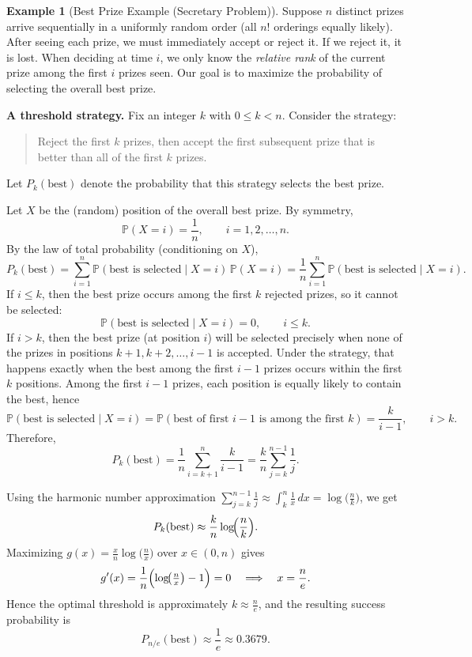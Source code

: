 \documentclass[11pt]{article}
\theoremstyle{plain}
\theoremstyle{definition}
\newtheorem{example}[theorem]{Example}
\theoremstyle{remark}
\begin{document}
	\begin{example}[Best Prize Example (Secretary Problem)]
		\label{ex:best-prize}
		Suppose \(n\) distinct prizes arrive sequentially in a uniformly random order (all \(n!\) orderings equally likely). After seeing each prize, we must immediately accept or reject it. If we reject it, it is lost. When deciding at time \(i\), we only know the \emph{relative rank} of the current prize among the first \(i\) prizes seen. Our goal is to maximize the probability of selecting the overall best prize.
		
		
		\textbf{A threshold strategy.}
		Fix an integer \(k\) with \(0 \le k < n\). Consider the strategy:
		\begin{quote}
			Reject the first \(k\) prizes, then accept the first subsequent prize that is better than all of the first \(k\) prizes.
		\end{quote}
		Let \(P_k(\text{best})\) denote the probability that this strategy selects the best prize.
		
		
		Let \(X\) be the (random) position of the overall best prize. By symmetry,
		\[
		\mathbb{P}(X=i)=\frac{1}{n}, \qquad i=1,2,\dots,n.
		\]
		By the law of total probability (conditioning on \(X\)),
		\[
		P_k(\text{best})
		= \sum_{i=1}^n \mathbb{P}(\text{best is selected}\mid X=i)\,\mathbb{P}(X=i)
		= \frac{1}{n}\sum_{i=1}^n \mathbb{P}(\text{best is selected}\mid X=i).
		\]
		If \(i\le k\), then the best prize occurs among the first \(k\) rejected prizes, so it cannot be selected:
		\[
		\mathbb{P}(\text{best is selected}\mid X=i)=0,\qquad i\le k.
		\]
		If \(i>k\), then the best prize (at position \(i\)) will be selected precisely when none of the prizes in positions
		\(k+1,k+2,\dots,i-1\) is accepted. Under the strategy, that happens exactly when the best among the first \(i-1\) prizes
		occurs within the first \(k\) positions. Among the first \(i-1\) prizes, each position is equally likely to contain the best, hence
		\[
		\mathbb{P}(\text{best is selected}\mid X=i)
		= \mathbb{P}(\text{best of first } i-1 \text{ is among the first } k)
		= \frac{k}{i-1},\qquad i>k.
		\]
		Therefore,
		\[
		P_k(\text{best})
		= \frac{1}{n}\sum_{i=k+1}^n \frac{k}{i-1}
		= \frac{k}{n}\sum_{j=k}^{n-1}\frac{1}{j}.
		\]
		
		
		Using the harmonic number approximation
		\(\sum_{j=k}^{n-1}\frac{1}{j} \approx \int_k^n \frac{1}{x}\,dx = \log\!\bigl(\frac{n}{k}\bigr)\),
		we get
		\[
		P_k(\text{best}) \approx \frac{k}{n}\log\!\Bigl(\frac{n}{k}\Bigr).
		\]
		Maximizing \(g(x)=\frac{x}{n}\log\!\bigl(\frac{n}{x}\bigr)\) over \(x\in(0,n)\) gives
		\[
		g'(x)=\frac{1}{n}\Bigl(\log\!\bigl(\tfrac{n}{x}\bigr)-1\Bigr)=0
		\quad\Longrightarrow\quad x=\frac{n}{e}.
		\]
		Hence the optimal threshold is approximately \(k \approx \frac{n}{e}\), and the resulting success probability is
		\[
		P_{n/e}(\text{best}) \approx \frac{1}{e}\approx 0.3679.
		\]
		
		
	\end{example}
	
\end{document}
